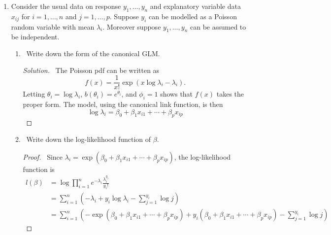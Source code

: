 \documentclass[12pt]{article}
\newcommand{\E}{\mathbb{E}}
\begin{document}
\begin{enumerate}[leftmargin=0cm,itemindent=.5cm,labelwidth=\itemindent,labelsep=0cm,align=left]
\begin{enumerate}
\begin{proof}
\ Yes, of course.  This is simply a result of the fact that 1) the residuals are the projection of $y$ onto the orthogonal complement of $X$, and 2) the vector $u$ of all ones is in the column space of $X$.  Thus we have 
$$
\sum \hat{e}_i = u^T \hat{e} = u^T (I-H) y = ((I-H)u)^T y = 0^T y = 0.
$$
\end{proof}

\item \ What is the expected value of $\hat{e}$?
\begin{proof}
\ Recall from part (a) that $\hat{e} = (I-H)(\gamma z + e)$, so
\begin{align*}
\E[\hat{e}] &= \E[ (I-H)(\gamma z + e) ]
\\
&= \E[(I-H)\gamma z] + (I-H)\E e
\\
&= (I-H)\gamma z
\end{align*}
\end{proof}

\end{enumerate}

\item Consider the usual data on response $y_1, \dots , y_n$ and explanatory variable data $x_{ij}$ for $i = 1, \dots , n$ and $j = 1, \dots , p$.  Suppose $y_i$ can be modelled as a Poisson random variable with mean $\lambda_i$.  Moreover suppose $y_1, \dots , y_n$ can be assumed to be independent.
\begin{enumerate}
\item \ Write down the form of the canonical GLM.
\begin{proof}[Solution]
\ The Poisson pdf can be written as
$$
f(x) = \frac{1}{x!}\exp(x\log\lambda_i - \lambda_i).
$$
Letting $\theta_i = \log \lambda_i$, $b(\theta_i) = e^{\theta_i}$, and $\phi_i = 1$ shows that $f(x)$ takes the proper form.  The model, using the canonical link function, is then
$$
\log \lambda_i = \beta_0 + \beta_1 x_{i1} + \cdots + \beta_p x_{ip}
$$
\end{proof}
\item \ Write down the log-likelihood function of $\beta$.
\begin{proof}
\ Since $\lambda_i = \exp (\beta_0 + \beta_1 x_{i1} + \cdots + \beta_p x_{ip})$, the log-likelihood function is
\begin{align*}
l(\beta) &= \log \prod_{i=1}^n e^{-\lambda_i} \frac{\lambda_i^{y_i}}{y_i!}
\\
&= \sum_{i=1}^n \left( -\lambda_i + y_i \log \lambda_i - \sum_{j=1}^{y_i} \log j  \right)
\\
&= \sum_{i=1}^n \left( -\exp (\beta_0 + \beta_1 x_{i1} + \cdots + \beta_p x_{ip}) + y_i (\beta_0 + \beta_1 x_{i1} + \cdots + \beta_p x_{ip}) - \sum_{j=1}^{y_i} \log j  \right)
\end{align*}
\end{proof}
\end{enumerate}


\end{enumerate}
\end{document}
